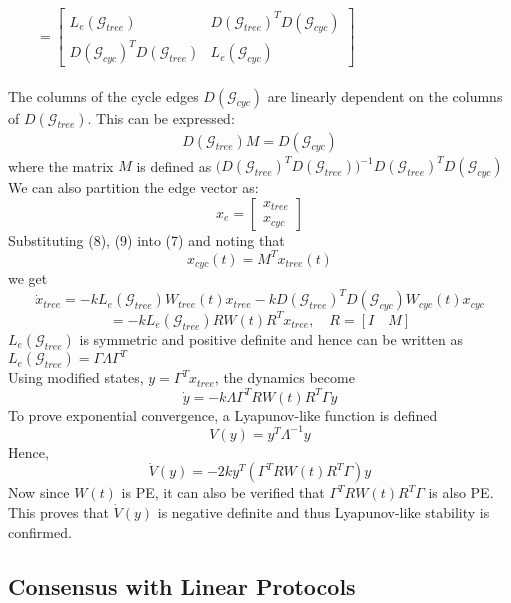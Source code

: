 \documentclass[journal]{IEEEtran}
\begin{document}
$ \qquad = \begin{bmatrix}
L_e(\mathcal{G}_{tree}) &  D(\mathcal{G}_{tree})^TD(\mathcal{G}_{cyc}) \\
D(\mathcal{G}_{cyc})^TD(\mathcal{G}_{tree}) & L_e(\mathcal{G}_{cyc})
\end{bmatrix}$
\\\\
The columns of the cycle edges $D(\mathcal{G}_{cyc})$ are linearly dependent on the columns of $D(\mathcal{G}_{tree})$. This can be expressed: \begin{align} D(\mathcal{G}_{tree})M = D(\mathcal{G}_{cyc})\end{align} where the matrix $M$ is defined as $\big(D(\mathcal{G}_{tree})^TD(\mathcal{G}_{tree})\big)^{-1}D(\mathcal{G}_{tree})^TD(\mathcal{G}_{cyc})$
We can also partition the edge vector as: $$ x_e = \begin{bmatrix}
x_{tree} \\ x_{cyc} 
\end{bmatrix} $$ Substituting (8), (9) into (7) and noting that \begin{equation} x_{cyc}(t) = M^Tx_{tree}(t)\end{equation} we get $$\dot{x}_{tree} = -kL_e(\mathcal{G}_{tree})W_{tree}(t)x_{tree} - kD(\mathcal{G}_{tree})^TD(\mathcal{G}_{cyc})W_{cyc}(t)x_{cyc}$$\begin{equation}= -kL_e(\mathcal{G}_{tree})RW(t)R^Tx_{tree}, \quad R = [I \quad M]\end{equation} $L_e(\mathcal{G}_{tree})$ is symmetric and positive definite and hence can be written as $L_e(\mathcal{G}_{tree}) = \Gamma\Lambda\Gamma^T$ \\Using modified states, $y = \Gamma^Tx_{tree}$, the dynamics become \begin{equation}\dot{y} = -k\Lambda\Gamma^TRW(t)R^T\Gamma y\end{equation}
To prove exponential convergence, a Lyapunov-like function is defined \begin{equation}V(y) = y^T\Lambda^{-1}y\end{equation} Hence, \begin{equation}\dot{V}(y) = -2ky^T(\Gamma^TRW(t)R^T\Gamma)y \end{equation} Now since $W(t)$ is PE, it can also be verified that $\Gamma^TRW(t)R^T\Gamma$ is also PE. This proves that $\dot{V}(y)$ is negative definite and thus Lyapunov-like stability is confirmed. 

\subsection{Consensus with Linear Protocols}
\end{document}

